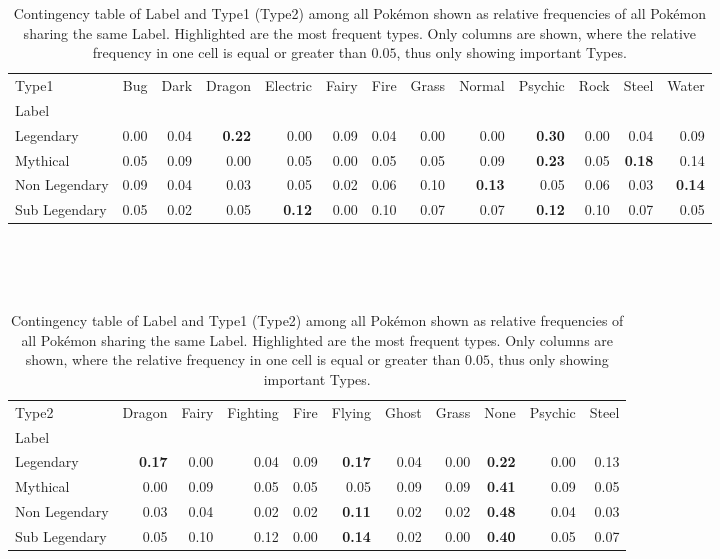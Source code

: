 \documentclass[conference]{IEEEtran}
\begin{document}
\begin{table}[t!]
	\centering
	\caption{Contingency table of Label and Type1 (Type2) among all Pokémon shown as relative frequencies of all Pokémon sharing the same Label. Highlighted are the most frequent types. Only columns are shown, where the relative frequency in one cell is equal or greater than $0.05$, thus only showing important Types.}
	\label{tab:type1}
	\begin{tabular}{lrrrrrrrrrrrr}
		\toprule
		Type1 &   Bug &  Dark &  Dragon &  Electric &  Fairy &  Fire &  Grass &  Normal &  Psychic &  Rock &  Steel &  Water \\
		Label         &       &       &         &           &        &       &        &         &          &       &        &        \\
		\midrule
		Legendary     &  0.00 &  0.04 &    \textbf{0.22} &      0.00 &   0.09 &  0.04 &   0.00 &    0.00 &    \textbf{ 0.30} &  0.00 &   0.04 &   0.09 \\
		Mythical      &  0.05 &  0.09 &    0.00 &      0.05 &   0.00 &  0.05 &   0.05 &    0.09 &     \textbf{0.23} &  0.05 &  \textbf{ 0.18} &  0.14 \\
		Non Legendary &  0.09 &  0.04 &    0.03 &      0.05 &   0.02 &  0.06 &   0.10 &    \textbf{0.13} &     0.05 &  0.06 &   0.03 &  \textbf{ 0.14} \\
		Sub Legendary &  0.05 &  0.02 &    0.05 &      \textbf{0.12} &   0.00 &  0.10 &   0.07 &    0.07 &    \textbf{ 0.12} &  0.10 &   0.07 &   0.05 \\
		\bottomrule
	\end{tabular}
	\\ \ \\ \ \\
	\begin{tabular}{lrrrrrrrrrr}
		\toprule
		Type2 &  Dragon &  Fairy &  Fighting &  Fire &  Flying &  Ghost &  Grass &  None &  Psychic &  Steel \\
		Label         &         &        &           &       &         &        &        &       &          &        \\
		\midrule
		Legendary     &    \textbf{0.17} &   0.00 &      0.04 &  0.09 &    \textbf{0.17} &   0.04 &   0.00 & \textbf{ 0.22} &     0.00 &   0.13 \\
		Mythical      &    0.00 &   0.09 &      0.05 &  0.05 &    0.05 &   0.09 &   0.09 &  \textbf{0.41} &     0.09 &   0.05 \\
		Non Legendary &    0.03 &   0.04 &      0.02 &  0.02 &    \textbf{0.11} &   0.02 &   0.02 &  \textbf{0.48} &     0.04 &   0.03 \\
		Sub Legendary &    0.05 &   0.10 &      0.12 &  0.00 &    \textbf{0.14} &   0.02 &   0.00 &  \textbf{0.40} &     0.05 &   0.07 \\
		\bottomrule
	\end{tabular}
\end{table}
\end{document}
